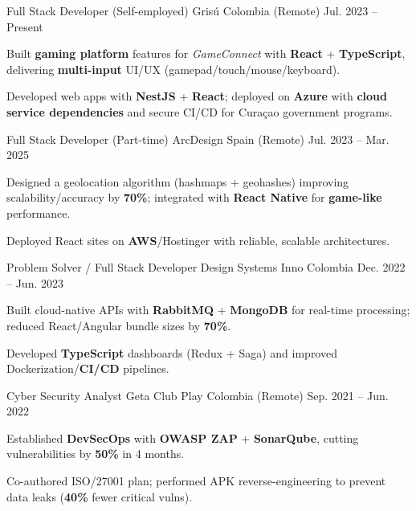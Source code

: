 \begin{cventries}
  \cventry
  {Full Stack Developer (Self-employed)}
  {Grisú}
  {Colombia (Remote)}
  {Jul. 2023 -- Present}
  {
    \begin{cvitems}
      \item {Built \textbf{gaming platform} features for \textit{GameConnect} with \textbf{React} + \textbf{TypeScript}, delivering \textbf{multi-input} UI/UX (gamepad/touch/mouse/keyboard).}
      \item {Developed web apps with \textbf{NestJS} + \textbf{React}; deployed on \textbf{Azure} with \textbf{cloud service dependencies} and secure CI/CD for Curaçao government programs.}
    \end{cvitems}
  }

  \cventry
  {Full Stack Developer (Part-time)}
  {ArcDesign}
  {Spain (Remote)}
  {Jul. 2023 -- Mar. 2025}
  {
    \begin{cvitems}
      \item {Designed a geolocation algorithm (hashmaps + geohashes) improving scalability/accuracy by \textbf{70\%}; integrated with \textbf{React Native} for \textbf{game-like} performance.}
      \item {Deployed React sites on \textbf{AWS}/Hostinger with reliable, scalable architectures.}
    \end{cvitems}
  }

  \cventry
  {Problem Solver / Full Stack Developer}
  {Design Systems Inno}
  {Colombia}
  {Dec. 2022 -- Jun. 2023}
  {
    \begin{cvitems}
      \item {Built cloud-native APIs with \textbf{RabbitMQ} + \textbf{MongoDB} for real-time processing; reduced React/Angular bundle sizes by \textbf{70\%}.}
      \item {Developed \textbf{TypeScript} dashboards (Redux + Saga) and improved Dockerization/\textbf{CI/CD} pipelines.}
    \end{cvitems}
  }

  \cventry
  {Cyber Security Analyst}
  {Geta Club Play}
  {Colombia (Remote)}
  {Sep. 2021 -- Jun. 2022}
  {
    \begin{cvitems}
      \item {Established \textbf{DevSecOps} with \textbf{OWASP ZAP} + \textbf{SonarQube}, cutting vulnerabilities by \textbf{50\%} in 4 months.}
      \item {Co-authored ISO/27001 plan; performed APK reverse-engineering to prevent data leaks (\textbf{40\%} fewer critical vulns).}
    \end{cvitems}
  }

\end{cventries}

